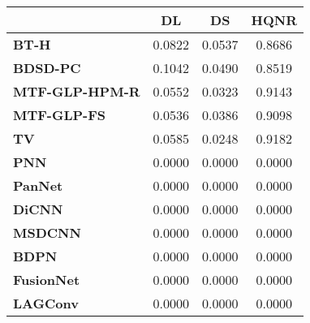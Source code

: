 \begin{tabular}{|l|c|c|c|}
\hline
&\textbf{DL}&\textbf{DS}&\textbf{HQNR}\\\hline
\textbf{BT-H}&0.0822&0.0537&0.8686\\\hline
\textbf{BDSD-PC}&0.1042&0.0490&0.8519\\\hline
\textbf{MTF-GLP-HPM-R}&0.0552&0.0323&0.9143\\\hline
\textbf{MTF-GLP-FS}&0.0536&0.0386&0.9098\\\hline
\textbf{TV}&0.0585&0.0248&0.9182\\\hline
\textbf{PNN}&0.0000&0.0000&0.0000\\\hline
\textbf{PanNet}&0.0000&0.0000&0.0000\\\hline
\textbf{DiCNN}&0.0000&0.0000&0.0000\\\hline
\textbf{MSDCNN}&0.0000&0.0000&0.0000\\\hline
\textbf{BDPN}&0.0000&0.0000&0.0000\\\hline
\textbf{FusionNet}&0.0000&0.0000&0.0000\\\hline
\textbf{LAGConv}&0.0000&0.0000&0.0000\\\hline
\end{tabular}
